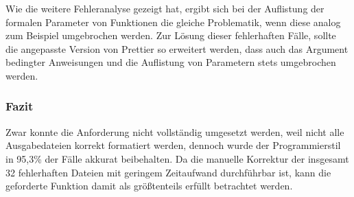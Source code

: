 Wie die weitere Fehleranalyse gezeigt hat, ergibt sich bei der Auflistung der formalen Parameter von Funktionen die gleiche Problematik, wenn diese analog zum Beispiel umgebrochen werden. Zur Lösung dieser fehlerhaften Fälle, sollte die angepasste Version von Prettier so erweitert werden, dass auch das Argument bedingter Anweisungen und die Auflistung  von Parametern stets umgebrochen werden.

\subsubsection{Fazit}

Zwar konnte die Anforderung nicht vollständig umgesetzt werden, weil nicht alle Ausgabedateien korrekt formatiert werden, dennoch wurde der Programmierstil in 95,3\% der Fälle akkurat beibehalten. Da die manuelle Korrektur der insgesamt 32 fehlerhaften Dateien mit geringem Zeitaufwand durchführbar ist, kann die geforderte Funktion damit als größtenteils erfüllt betrachtet werden.
